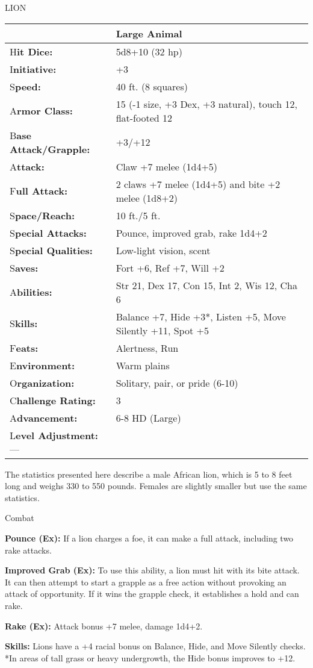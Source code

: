 \documentclass{article}
\begin{document}
\vspace{12pt}
LION

\begin{tabular}{|>{\raggedright}p{88pt}|>{\raggedright}p{237pt}|}
\hline
  & Large Animal\tabularnewline
\hline
H\textbf{it Dice:} & 5d8+10 (32 hp)\tabularnewline
\hline
I\textbf{nitiative:} & +3\tabularnewline
\hline
S\textbf{peed:} & 40 ft. (8 squares)\tabularnewline
\hline
A\textbf{rmor Class:} & 15 (-1 size, +3 Dex, +3 natural), touch 12, flat-footed 
12\tabularnewline
\hline
B\textbf{ase Attack/Grapple:} & +3/+12\tabularnewline
\hline
A\textbf{ttack:} & Claw +7 melee (1d4+5)\tabularnewline
\hline
F\textbf{ull Attack:} & 2 claws +7 melee (1d4+5) and bite +2 melee (1d8+2)\tabularnewline
\hline
S\textbf{pace/Reach:} & 10 ft./5 ft.\tabularnewline
\hline
S\textbf{pecial Attacks:} & Pounce, improved grab, rake 1d4+2\tabularnewline
\hline
S\textbf{pecial Qualities:} & Low-light vision, scent\tabularnewline
\hline
S\textbf{aves:} & Fort +6, Ref +7, Will +2\tabularnewline
\hline
A\textbf{bilities:} & Str 21, Dex 17, Con 15, Int 2, Wis 12, Cha 6\tabularnewline
\hline
S\textbf{kills:} & Balance +7, Hide +3*, Listen +5, Move Silently +11, Spot +5\tabularnewline
\hline
F\textbf{eats:} & Alertness, Run\tabularnewline
\hline
E\textbf{nvironment:} & Warm plains\tabularnewline
\hline
O\textbf{rganization:} & Solitary, pair, or pride (6-10)\tabularnewline
\hline
C\textbf{hallenge Rating:} & 3\tabularnewline
\hline
A\textbf{dvancement:} & 6-8 HD (Large)\tabularnewline
\hline
L\textbf{evel Adjustment:}--- & \tabularnewline
\hline
\end{tabular}

The statistics presented here describe a male African lion, which is 5 to 8 feet 
long and weighs 330 to 550 pounds. Females are slightly smaller but use the same 
statistics.

Combat

\textbf{Pounce (Ex): }If a lion charges a foe, it can make a full attack, including 
two rake attacks.

\textbf{Improved Grab (Ex): }To use this ability, a lion must hit with its bite 
attack. It can then attempt to start a grapple as a free action without provoking 
an attack of opportunity. If it wins the grapple check, it establishes a hold and 
can rake.

\textbf{Rake (Ex):} Attack bonus +7 melee, damage 1d4+2.

\textbf{Skills: }Lions have a +4 racial bonus on Balance, Hide, and Move Silently 
checks. *In areas of tall grass or heavy undergrowth, the Hide bonus improves to 
+12.
\end{document}
